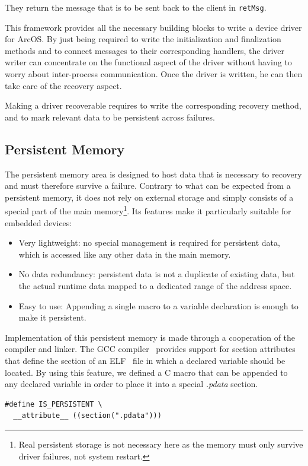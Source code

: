 \documentclass[times, 10pt, twocolumn]{article}
\begin{document}
They return the message that is to be sent back to the client in \texttt{retMsg}.

This framework provides all the necessary building blocks to write a device driver for ArcOS. By just being required to write the initialization and finalization methods and to connect messages to their corresponding handlers, the driver writer can concentrate on the functional aspect of the driver without having to worry about inter-process communication. Once the driver is written, he can then take care of the recovery aspect.

Making a driver recoverable requires to write the corresponding recovery method, and to mark relevant data to be persistent across failures.

\subsection{Persistent Memory}
The persistent memory area is designed to host data that is necessary to recovery and must therefore survive a failure. Contrary to what can be expected from a persistent memory, it does not rely on external storage and simply consists of a special part of the main memory\footnote{Real persistent storage is not necessary here as the memory must only survive driver failures, not system restart.}. Its features make it particularly suitable for embedded devices:
\begin{itemize}
\item Very lightweight: no special management is required for persistent data, which is accessed like any other data in the main memory.
\item No data redundancy: persistent data is not a duplicate of existing data, but the actual runtime data mapped to a dedicated range of the address space.
\item Easy to use: Appending a single macro to a variable declaration is enough to make it persistent.
\end{itemize}

Implementation of this persistent memory is made through a cooperation of the compiler and linker. The GCC compiler~\cite{GCCManual} provides support for section attributes that define the section of an ELF~\cite{ELFSpec} file in which a declared variable should be located. By using this feature, we defined a C macro that can be appended to any declared variable in order to place it into a special \emph{.pdata} section.

{\scriptsize{
\begin{verbatim}
#define IS_PERSISTENT \
  __attribute__ ((section(".pdata")))
\end{verbatim}
}}
\end{document}

